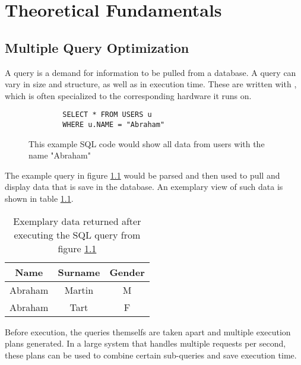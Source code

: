 \chapter{Theoretical Fundamentals} %

\label{chapter:theoretical_fundamentals} %


\section{Multiple Query Optimization}

A query\cite{codd_relational_1970} is a demand for information to be pulled from a database. A query can vary in size and structure, as well as in execution time. These are written with , which is often specialized to the corresponding hardware\cite{shirgoldbird_microsoft_nodate}\cite{the_postgresql_global_development_group_postgresql_2022} it runs on. 

    
\begin{figure}[!h]
    \centering
    \begin{verbatim}
        SELECT * FROM USERS u
        WHERE u.NAME = "Abraham"
    \end{verbatim}
    \caption{This example SQL code would show all data from users with the name "Abraham"}
    \label{fig:sql_query_example}
\end{figure}

The example query in figure \ref{fig:sql_query_example} would be parsed and then used to pull and display data that is save in the database. An exemplary view of such data is shown in table \ref{table:sql_query_result_example}.

\begin{table}[!h]
    \centering
    \begin{tabular}{|c|c|c|}
        \hline
        Name    & Surname & Gender \\ \hline
        Abraham & Martin  & M      \\ \hline
        Abraham & Tart    & F      \\ \hline
    \end{tabular}
    \caption{Exemplary data returned after executing the SQL query from figure \ref{fig:sql_query_example}}
    \label{table:sql_query_result_example}
\end{table}

Before execution, the queries themselfs are taken apart and multiple execution plans generated\cite{}. In a large system that handles multiple requests per second, these plans can be used to combine certain sub-queries and save execution time\cite{}.

\newpage
